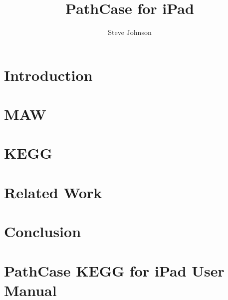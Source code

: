 \documentclass[12pt]{report}
\title{PathCase for iPad}
\author{Steve Johnson}
\begin{document}


\setcounter{page}{1}


\tableofcontents

\listoftables

\listoffigures

\doublespace

\pagebreak

\setcounter{page}{1}


\pagebreak

\chapter{Introduction}
\label{ch:introduction}


\chapter{MAW}
\label{ch:maw_smda}


\chapter{KEGG}
\label{ch:kegg}


\chapter{Related Work}
\label{ch:related_work}


\chapter{Conclusion}
\label{ch:conclusion}


\appendix

\chapter{PathCase KEGG for iPad User Manual}
\label{ch:kegg_manual}


\nocite{*}


\end{document}
